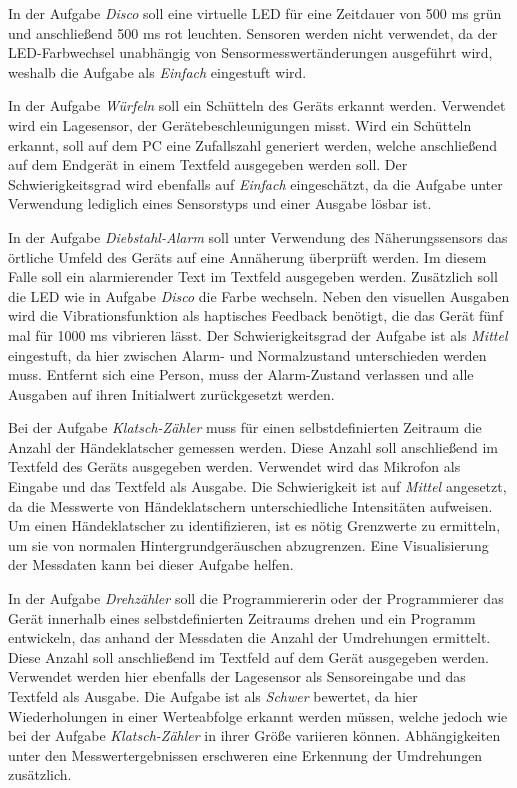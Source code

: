 \documentclass[11pt,a4paper]{report}
\begin{document}
In der Aufgabe \textit{Disco} soll eine virtuelle LED für eine Zeitdauer von 500 ms grün und anschließend 500 ms rot leuchten.
Sensoren werden nicht verwendet, da der LED-Farbwechsel unabhängig von Sensormesswertänderungen ausgeführt wird, weshalb die Aufgabe als \textit{Einfach} eingestuft wird.

In der Aufgabe \textit{Würfeln} soll ein Schütteln des Geräts erkannt werden.
Verwendet wird ein Lagesensor, der Gerätebeschleunigungen misst.
Wird ein Schütteln erkannt, soll auf dem PC eine Zufallszahl generiert werden, welche anschließend auf dem Endgerät in einem Textfeld ausgegeben werden soll.
Der Schwierigkeitsgrad wird ebenfalls auf \textit{Einfach} eingeschätzt, da die Aufgabe unter Verwendung lediglich eines Sensorstyps und einer Ausgabe lösbar ist.

In der Aufgabe \textit{Diebstahl-Alarm} soll unter Verwendung des Näherungssensors das örtliche Umfeld des Geräts auf eine Annäherung überprüft werden.
Im diesem Falle soll ein alarmierender Text im Textfeld ausgegeben werden.
Zusätzlich soll die LED wie in Aufgabe \textit{Disco} die Farbe wechseln.
Neben den visuellen Ausgaben wird die Vibrationsfunktion als haptisches Feedback benötigt, die das Gerät fünf mal für 1000 ms vibrieren lässt.
Der Schwierigkeitsgrad der Aufgabe ist als \textit{Mittel} eingestuft, da hier zwischen Alarm- und Normalzustand unterschieden werden muss.
Entfernt sich eine Person, muss der Alarm-Zustand verlassen und alle Ausgaben auf ihren Initialwert zurückgesetzt werden.

Bei der Aufgabe \textit{Klatsch-Zähler} muss für einen selbstdefinierten Zeitraum die Anzahl der Händeklatscher gemessen werden.
Diese Anzahl soll anschließend im Textfeld des Geräts ausgegeben werden.
Verwendet wird das Mikrofon als Eingabe und das Textfeld als Ausgabe.
Die Schwierigkeit ist auf \textit{Mittel} angesetzt, da die Messwerte von Händeklatschern unterschiedliche Intensitäten aufweisen.
Um einen Händeklatscher zu identifizieren, ist es nötig Grenzwerte zu ermitteln, um sie von normalen Hintergrundgeräuschen abzugrenzen.
Eine Visualisierung der Messdaten kann bei dieser Aufgabe helfen.

In  der Aufgabe \textit{Drehzähler} soll die Programmiererin oder der Programmierer das Gerät innerhalb eines selbstdefinierten Zeitraums drehen und ein Programm entwickeln, das anhand der Messdaten die Anzahl der Umdrehungen ermittelt.
Diese Anzahl soll anschließend im Textfeld auf dem Gerät ausgegeben werden.
Verwendet werden hier ebenfalls der Lagesensor als Sensoreingabe und das Textfeld als Ausgabe.
Die Aufgabe ist als \textit{Schwer} bewertet, da hier Wiederholungen in einer Werteabfolge erkannt werden müssen, welche jedoch wie bei der Aufgabe \textit{Klatsch-Zähler} in ihrer Größe variieren können.
Abhängigkeiten unter den Messwertergebnissen erschweren eine Erkennung der Umdrehungen zusätzlich.
\end{document}
